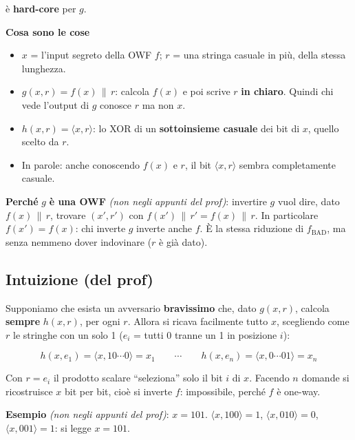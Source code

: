è \textbf{hard-core} per \(g\).

\begin{nota}

\textbf{Cosa sono le cose}

\begin{itemize}
\tightlist
\item
  \(x\) = l'input segreto della OWF \(f\); \(r\) = una stringa casuale in più, della stessa lunghezza.
\item
  \(g(x, r) = f(x) \,\|\, r\): calcola \(f(x)\) e poi scrive \(r\) \textbf{in chiaro}. Quindi chi vede l'output di \(g\) conosce \(r\) ma non \(x\).
\item
  \(h(x, r) = \langle x, r \rangle\): lo XOR di un \textbf{sottoinsieme casuale} dei bit di \(x\), quello scelto da \(r\).
\item
  In parole: anche conoscendo \(f(x)\) e \(r\), il bit \(\langle x, r \rangle\) sembra completamente casuale.
\end{itemize}

\end{nota}

\textbf{Perché} \(g\) \textbf{è una OWF} \emph{(non negli appunti del prof)}: invertire \(g\) vuol dire, dato \(f(x) \,\|\, r\), trovare \((x', r')\) con \(f(x') \,\|\, r' = f(x) \,\|\, r\). In particolare \(f(x') = f(x)\): chi inverte \(g\) inverte anche \(f\). È la stessa riduzione di \(f_{\text{BAD}}\), ma senza nemmeno dover indovinare (\(r\) è già dato).

\subsection{Intuizione (del prof)}

Supponiamo che esista un avversario \textbf{bravissimo} che, dato \(g(x, r)\), calcola \textbf{sempre} \(h(x, r)\), per ogni \(r\). Allora si ricava facilmente tutto \(x\), scegliendo come \(r\) le stringhe con un solo 1 (\(e_i\) = tutti 0 tranne un 1 in posizione \(i\)):

\[
h(x, e_1) = \langle x, 10\cdots0 \rangle = x_1 \qquad \cdots \qquad h(x, e_n) = \langle x, 0\cdots01 \rangle = x_n
\]

Con \(r = e_i\) il prodotto scalare ``seleziona'' solo il bit \(i\) di \(x\). Facendo \(n\) domande si ricostruisce \(x\) bit per bit, cioè si inverte \(f\): impossibile, perché \(f\) è one-way.

\begin{esempio}

\textbf{Esempio} \emph{(non negli appunti del prof)}: \(x = 101\). \(\langle x, 100 \rangle = 1\), \(\langle x, 010 \rangle = 0\), \(\langle x, 001 \rangle = 1\): si legge \(x = 101\).

\end{esempio}

